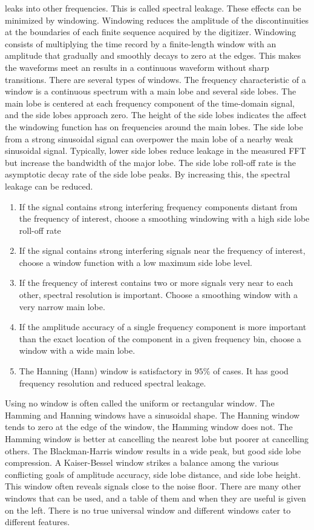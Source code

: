 \documentclass[oneside]{book}
\theoremstyle{mystyle}
\begin{document}
leaks into other frequencies. This is called spectral leakage. These effects can be minimized by windowing. Windowing reduces the amplitude of the discontinuities at the boundaries of each finite sequence acquired by the digitizer. Windowing consists of multiplying the time record by a finite-length window with an amplitude that gradually and smoothly decays to zero at the edges. This makes the waveforms meet an results in a continuous waveform without sharp transitions. There are several types of windows. The frequency characteristic of a window is a continuous spectrum with a main lobe and several side lobes. The main lobe is centered at each frequency component of the time-domain signal, and the side lobes approach zero. The height of the side lobes indicates the affect the windowing function has on frequencies around the main lobes. The side lobe from a strong sinusoidal signal can overpower the main lobe of a nearby weak sinusoidal signal. Typically, lower side lobes reduce leakage in the measured FFT but increase the bandwidth of the major lobe. The side lobe roll-off rate is the asymptotic decay rate of the side lobe peaks. By increasing this, the spectral leakage can be reduced.
\begin{enumerate}
\item If the signal contains strong interfering frequency components distant from the frequency of interest, choose a smoothing windowing with a high side lobe roll-off rate
\item If the signal contains strong interfering signals near the frequency of interest, choose a window function with a low maximum side lobe level.
\item If the frequency of interest contains two or more signals very near to each other, spectral resolution is important. Choose a smoothing window with a very narrow main lobe.
\item If the amplitude accuracy of a single frequency component is more important than the exact location of the component in a given frequency bin, choose a window with a wide main lobe.
\item The Hanning (Hann) window is satisfactory in $95\%$ of cases. It has good frequency resolution and reduced spectral leakage. 
\end{enumerate}
Using no window is often called the uniform or rectangular window. The Hamming and Hanning windows have a sinusoidal shape. The Hanning window tends to zero at the edge of the window, the Hamming window does not. The Hamming window is better at cancelling the nearest lobe but poorer at cancelling others. The Blackman-Harris window results in a wide peak, but good side lobe compression. A Kaiser-Bessel window strikes a balance among the various conflicting goals of amplitude accuracy, side lobe distance, and side lobe height. This window often reveals signals close to the noise floor. There are many other windows that can be used, and a table of them and when they are useful is given on the left. There is no true universal window and different windows cater to different features.
\end{document}

